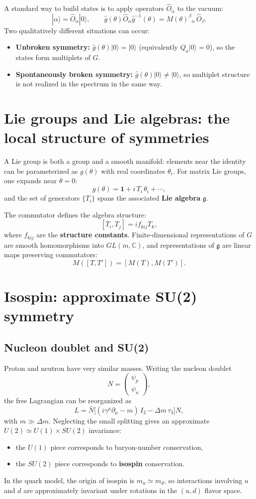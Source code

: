 A standard way to build states is to apply operators $\hat O_\alpha$ to the vacuum:
\[
|\alpha\rangle=\hat O_\alpha|0\rangle,\qquad
\hat g(\theta)\hat O_\alpha \hat g^{-1}(\theta)=M(\theta)^\beta{}_\alpha\,\hat O_\beta.
\]
Two qualitatively different situations can occur:
\begin{itemize}
  \item \textbf{Unbroken symmetry:} $\hat g(\theta)|0\rangle=|0\rangle$ (equivalently $Q_a|0\rangle=0$), so the states form multiplets of $G$.
  \item \textbf{Spontaneously broken symmetry:} $\hat g(\theta)|0\rangle\neq |0\rangle$, so multiplet structure is not realized in the spectrum in the same way.
\end{itemize}

\section{Lie groups and Lie algebras: the local structure of symmetries}
A Lie group is both a group and a smooth manifold: elements near the identity can be parameterized as $g(\theta)$ with real coordinates $\theta_i$. For matrix Lie groups, one expands near $\theta=0$:
\[
g(\theta)=\mathbf{1} + i\,T_i\,\theta_i + \cdots,
\]
and the set of generators $\{T_i\}$ spans the associated \textbf{Lie algebra} $\mathfrak{g}$.

The commutator defines the algebra structure:
\[
[T_i,T_j]=i f_{kij}T_k,
\]
where $f_{kij}$ are the \textbf{structure constants}. Finite-dimensional representations of $G$ are smooth homomorphisms into $GL(m,\mathbb{C})$, and representations of $\mathfrak{g}$ are linear maps preserving commutators:
\[
M([T,T'])=[M(T),M(T')].
\]

\section{Isospin: approximate SU(2) symmetry}
\subsection{Nucleon doublet and SU(2)}
Proton and neutron have very similar masses. Writing the nucleon doublet
\[
N=\begin{pmatrix}\psi_p\\ \psi_n\end{pmatrix},
\]
the free Lagrangian can be reorganized as
\[
L=\bar N\Big[(i\gamma^\mu\partial_\mu - m)\,I_2 - \Delta m\,\tau_3\Big]N,
\]
with $m\gg \Delta m$. Neglecting the small splitting gives an approximate $U(2)\simeq U(1)\times SU(2)$ invariance:
\begin{itemize}
  \item the $U(1)$ piece corresponds to baryon-number conservation,
  \item the $SU(2)$ piece corresponds to \textbf{isospin} conservation.
\end{itemize}
In the quark model, the origin of isospin is $m_u\simeq m_d$, so interactions involving $u$ and $d$ are approximately invariant under rotations in the $(u,d)$ flavor space.

